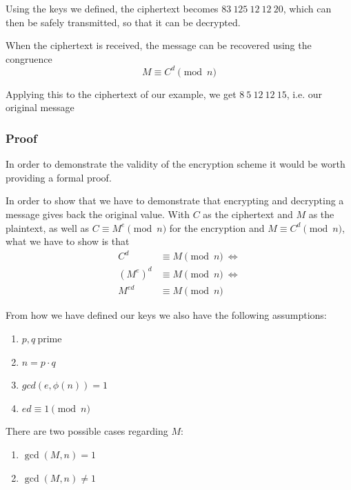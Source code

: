 \documentclass[12pt, titlepage]{article}
\begin{document}
        Using the keys we defined, the ciphertext becomes $83\ 125\ 12\ 12\ 20$, which can then
        be safely transmitted, so that it can be decrypted.   

        When the ciphertext is received, the message can be recovered using the congruence
        \begin{equation*}
            M \equiv C^{d} \pmod{n}
        \end{equation*}

        Applying this to the ciphertext of our example, we get $8\ 5\ 12\ 12\ 15$, i.e. our
        original message

    
        \subsubsection{Proof}
        In order to demonstrate the validity of the encryption scheme it would be worth
        providing a formal proof. \cite{so_rsa_proof}

        In order to show that we have to demonstrate that encrypting and decrypting a
        message gives back the original value. With $C$ as the ciphertext and $M$ as the
        plaintext, as well as $C \equiv M^e \pmod{n}$ for the encryption and $M \equiv C^d
        \pmod{n}$, what we have to show is that
        \begin{align*}
            C^d     &\equiv M \pmod{n}\ \iff \\
            (M^e)^d &\equiv M \pmod{n}\ \iff \\
            M^{ed}  &\equiv M \pmod{n}
        \end{align*}

        From how we have defined our keys we also have the following assumptions:
        \begin{enumerate}
            \item $p,q\ \text{prime}$
            \item $n = p \cdot q$
            \item $gcd(e, \phi(n)) = 1$ 
            \item $ed \equiv 1 \pmod{n}$
        \end{enumerate}

        There are two possible cases regarding $M$:
        \begin{enumerate}
            \item $\gcd(M, n) = 1$
            \item $\gcd(M, n) \not= 1$
        \end{enumerate}
\end{document}
